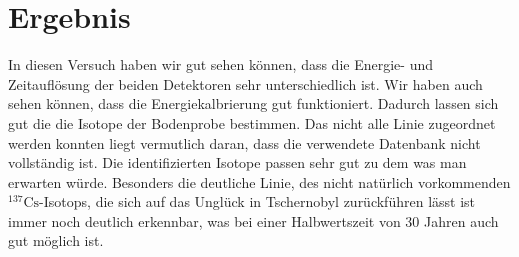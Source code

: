 \documentclass[11pt, ngerman, fleqn, DIV=15, headinclude, BCOR=2cm]{scrreprt}
\begin{document}
\chapter{Ergebnis}

In diesen Versuch haben wir gut sehen können, dass die Energie- und Zeitauflösung der
beiden Detektoren sehr unterschiedlich ist. Wir haben auch sehen können, dass
die Energiekalbrierung gut funktioniert. 
Dadurch lassen sich gut die die Isotope der Bodenprobe bestimmen. Das nicht
alle Linie zugeordnet werden konnten liegt vermutlich daran, dass die
verwendete Datenbank nicht vollständig ist. Die identifizierten Isotope passen
sehr gut zu dem was man erwarten würde. Besonders die deutliche Linie, des
nicht natürlich vorkommenden $^{137}\text{Cs}$-Isotops, die sich auf das Unglück
in Tschernobyl zurückführen lässt ist immer noch deutlich erkennbar, was bei
einer Halbwertszeit von 30 Jahren auch gut möglich ist.


\begin{appendix}


\end{appendix}
\end{document}
